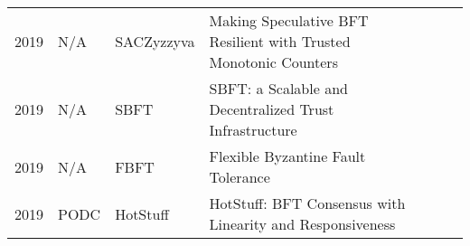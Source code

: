 \documentclass{article}
\begin{document}
\begin{landscape}
\begin{table}[]
{\begin{tabular}{llll|l|l|l|}
2019 & N/A               & SACZyzzyva              & Making Speculative BFT Resilient with Trusted Monotonic Counters                          &            &          &              \\ \cline{5-7} 
2019 & N/A               & SBFT                    & SBFT: a Scalable and Decentralized Trust Infrastructure                                   &            &          &              \\ \cline{5-7} 
2019 & N/A               & FBFT                    & Flexible Byzantine Fault Tolerance                                                        &            &          &              \\ \cline{5-7} 
2019 & PODC              & HotStuff                & HotStuff: BFT Consensus with Linearity and Responsiveness                                 &            &          &              \\ \hline
\end{tabular}%
}
\end{table}
\end{landscape}
\end{document}

